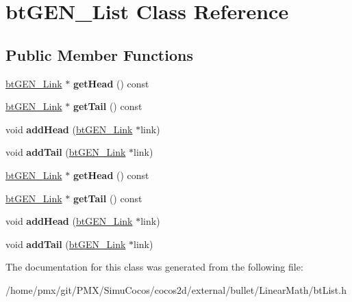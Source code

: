 \hypertarget{classbtGEN__List}{}\section{bt\+G\+E\+N\+\_\+\+List Class Reference}
\label{classbtGEN__List}
\subsection*{Public Member Functions}
\begin{DoxyCompactItemize}
\item 
\mbox{\label{classbtGEN__List_a8cdac993b5beba3fdc1a3621e8679dca}} 
\hyperlink{classbtGEN__Link}{bt\+G\+E\+N\+\_\+\+Link} $\ast$ {\bfseries get\+Head} () const
\item 
\mbox{\label{classbtGEN__List_a3ac0596658ca7f0a73134e0725da97e3}} 
\hyperlink{classbtGEN__Link}{bt\+G\+E\+N\+\_\+\+Link} $\ast$ {\bfseries get\+Tail} () const
\item 
\mbox{\label{classbtGEN__List_a5f2e37ec52ee6ba0ad73d98ff399fc8c}} 
void {\bfseries add\+Head} (\hyperlink{classbtGEN__Link}{bt\+G\+E\+N\+\_\+\+Link} $\ast$link)
\item 
\mbox{\label{classbtGEN__List_ae629b465f074aec6212e1aec66e9e555}} 
void {\bfseries add\+Tail} (\hyperlink{classbtGEN__Link}{bt\+G\+E\+N\+\_\+\+Link} $\ast$link)
\item 
\mbox{\label{classbtGEN__List_a8cdac993b5beba3fdc1a3621e8679dca}} 
\hyperlink{classbtGEN__Link}{bt\+G\+E\+N\+\_\+\+Link} $\ast$ {\bfseries get\+Head} () const
\item 
\mbox{\label{classbtGEN__List_a3ac0596658ca7f0a73134e0725da97e3}} 
\hyperlink{classbtGEN__Link}{bt\+G\+E\+N\+\_\+\+Link} $\ast$ {\bfseries get\+Tail} () const
\item 
\mbox{\label{classbtGEN__List_a5f2e37ec52ee6ba0ad73d98ff399fc8c}} 
void {\bfseries add\+Head} (\hyperlink{classbtGEN__Link}{bt\+G\+E\+N\+\_\+\+Link} $\ast$link)
\item 
\mbox{\label{classbtGEN__List_ae629b465f074aec6212e1aec66e9e555}} 
void {\bfseries add\+Tail} (\hyperlink{classbtGEN__Link}{bt\+G\+E\+N\+\_\+\+Link} $\ast$link)
\end{DoxyCompactItemize}


The documentation for this class was generated from the following file\+:\begin{DoxyCompactItemize}
\item 
/home/pmx/git/\+P\+M\+X/\+Simu\+Cocos/cocos2d/external/bullet/\+Linear\+Math/bt\+List.\+h\end{DoxyCompactItemize}
